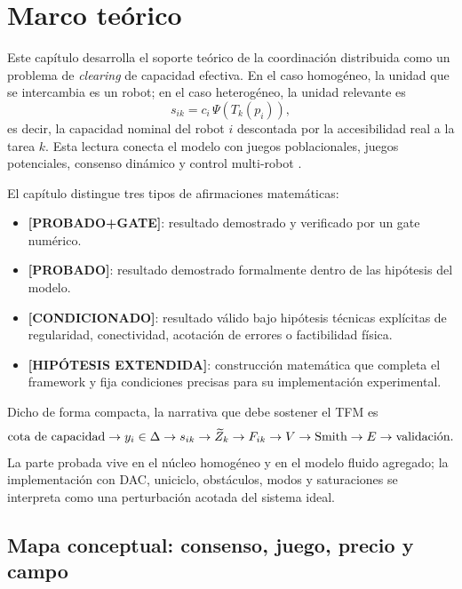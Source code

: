 \section{Marco teórico}
\label{sec:marco}

Este capítulo desarrolla el soporte teórico de la coordinación distribuida como un
problema de \emph{clearing} de capacidad efectiva. En el caso homogéneo, la unidad que
se intercambia es un robot; en el caso heterogéneo, la unidad relevante es
\[
  s_{ik}=c_i\,\Psi(T_k(p_i)),
\]
es decir, la capacidad nominal del robot $i$ descontada por la accesibilidad real a la
tarea $k$. Esta lectura conecta el modelo con juegos poblacionales, juegos potenciales,
consenso dinámico y control multi-robot \citep{sandholm2010population,
quijano2017population,barreiro2017distributed,kia2019tutorial,bullo2009distributed}.

El capítulo distingue tres tipos de afirmaciones matemáticas:
\begin{itemize}
  \item \textbf{[PROBADO+GATE]}: resultado demostrado y verificado por un gate numérico.
  \item \textbf{[PROBADO]}: resultado demostrado formalmente dentro de las hipótesis del
  modelo.
  \item \textbf{[CONDICIONADO]}: resultado válido bajo hipótesis técnicas explícitas de
  regularidad, conectividad, acotación de errores o factibilidad física.
  \item \textbf{[HIPÓTESIS EXTENDIDA]}: construcción matemática que completa el
  framework y fija condiciones precisas para su implementación experimental.
\end{itemize}

Dicho de forma compacta, la narrativa que debe sostener el TFM es
\[
  \text{cota de capacidad}
  \rightarrow y_i\in\Delta
  \rightarrow s_{ik}
  \rightarrow \widetilde{Z}_k
  \rightarrow F_{ik}
  \rightarrow V
  \rightarrow \text{Smith}
  \rightarrow E
  \rightarrow \text{validación}.
\]
La parte probada vive en el núcleo homogéneo y en el modelo fluido agregado; la
implementación con DAC, uniciclo, obstáculos, modos y saturaciones se interpreta como
una perturbación acotada del sistema ideal.

\subsection{Mapa conceptual: consenso, juego, precio y campo}

